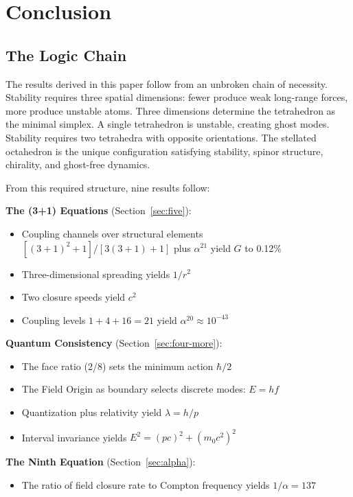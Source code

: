\documentclass[aps,prd,preprint,superscriptaddress,showpacs,preprintnumbers,amsmath,amssymb,nofootinbib]{revtex4-2}
\begin{document}
\section{Conclusion}
\label{sec:conclusion}

\subsection{The Logic Chain}
\label{subsec:chain}

The results derived in this paper follow from an unbroken chain of necessity. Stability requires three spatial dimensions: fewer produce weak long-range forces, more produce unstable atoms. Three dimensions determine the tetrahedron as the minimal simplex. A single tetrahedron is unstable, creating ghost modes. Stability requires two tetrahedra with opposite orientations. The stellated octahedron is the unique configuration satisfying stability, spinor structure, chirality, and ghost-free dynamics.

From this required structure, nine results follow:

\textbf{The (3+1) Equations} (Section~\ref{sec:five}):
\begin{itemize}
\item Coupling channels over structural elements $[(3+1)^2+1]/[3(3+1)+1]$ plus $\alpha^{21}$ yield $G$ to 0.12\%
\item Three-dimensional spreading yields $1/r^2$
\item Two closure speeds yield $c^2$
\item Coupling levels $1 + 4 + 16 = 21$ yield $\alpha^{20} \approx 10^{-43}$
\end{itemize}

\textbf{Quantum Consistency} (Section~\ref{sec:four-more}):
\begin{itemize}
\item The face ratio (2/8) sets the minimum action $\hbar/2$
\item The Field Origin as boundary selects discrete modes: $E = hf$
\item Quantization plus relativity yield $\lambda = h/p$
\item Interval invariance yields $E^2 = (pc)^2 + (m_0 c^2)^2$
\end{itemize}

\textbf{The Ninth Equation} (Section~\ref{sec:alpha}):
\begin{itemize}
\item The ratio of field closure rate to Compton frequency yields $1/\alpha = 137$
\end{itemize}
\end{document}
